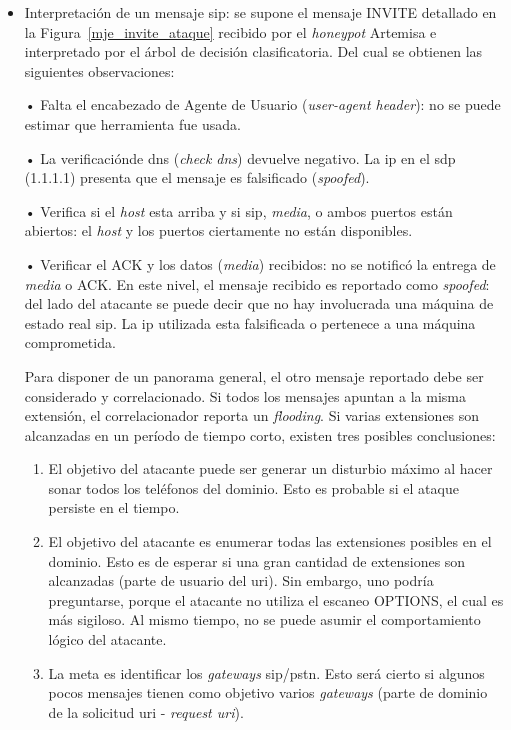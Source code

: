 \documentclass[a4paper,12pt]{report}
\begin{document}
\begin{itemize}
  
\item Interpretación de un mensaje \ac{sip}: 
se supone el mensaje INVITE detallado en la Figura~\ref{mje_invite_ataque} recibido
por el \emph{honeypot} Artemisa e interpretado por el árbol de decisión
clasificatoria. Del cual se obtienen las siguientes observaciones:       
  
• Falta el encabezado de Agente de Usuario (\emph{user-agent header}): no se
puede estimar que herramienta fue usada.

• La verificaciónde \ac{dns} (\emph{check \ac{dns}}) devuelve negativo. La \ac{ip} en el \ac{sdp}
(1.1.1.1) presenta que el mensaje es falsificado (\emph{spoofed}).

• Verifica si el \emph{host} esta arriba y si \ac{sip}, \emph{media}, o ambos puertos están
abiertos: el \emph{host} y los puertos ciertamente no están disponibles.

• Verificar el ACK y los datos (\emph{media}) recibidos: no se notificó la entrega de
\emph{media} o ACK. En este nivel, el mensaje recibido es reportado como \emph{spoofed}: del
lado del atacante se puede decir que no hay involucrada una máquina de estado
real \ac{sip}. La \ac{ip} utilizada esta falsificada o pertenece a una máquina
comprometida.

Para disponer de un panorama general, el otro mensaje reportado debe ser
considerado y correlacionado. Si todos los mensajes apuntan a la misma
extensión, el correlacionador reporta un \emph{flooding}. Si varias extensiones son
alcanzadas en un período de tiempo corto, existen tres posibles conclusiones:

\begin{enumerate}
   
\item          
El objetivo del atacante puede ser generar un disturbio máximo al hacer sonar
todos los teléfonos del dominio. Esto es probable si el ataque persiste en el
tiempo.

\item
El objetivo del atacante es enumerar todas las extensiones posibles en el
dominio. Esto es de esperar si una gran cantidad de extensiones son alcanzadas
(parte de usuario del \ac{uri}). Sin embargo, uno podría preguntarse, porque el
atacante no utiliza el escaneo OPTIONS, el cual es más sigiloso. Al mismo
tiempo, no se puede asumir el comportamiento lógico del atacante. 

\item 
La meta es identificar los \emph{gateways} \ac{sip}/\ac{pstn}. Esto será cierto si algunos pocos
mensajes tienen como objetivo varios \emph{gateways} (parte de dominio de la solicitud
\ac{uri} - \emph{request \ac{uri}}).


\end{enumerate}
\end{itemize}
\end{document}
